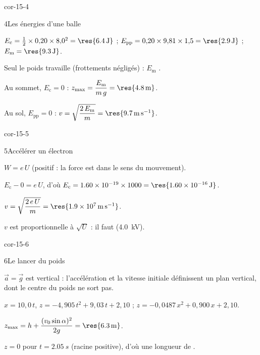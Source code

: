 \begin{blocLivre}{cor-15-4}
\begin{corrige}{4}{Les énergies d'une balle}
\begin{questions}
\item $E_\mathrm{c}=\frac12\times0{,}20\times8{,}0^2=\res{\qty{6,4}{J}}$ ; $E_\mathrm{pp}=0{,}20\times9{,}81\times1{,}5=\res{\qty{2,9}{J}}$ ;
$E_\mathrm{m}=\res{\qty{9,3}{J}}$.
\item Seul le poids travaille (frottements négligés) : $E_\mathrm{m}$ .
\item Au sommet, $E_\mathrm{c}=0$ : $z_{\max}=\dfrac{E_\mathrm{m}}{m\,g}=\res{\qty{4,8}{m}}$.
\item Au sol, $E_\mathrm{pp}=0$ : $v=\sqrt{\dfrac{2\,E_\mathrm{m}}{m}}=\res{\qty{9,7}{m.s^{-1}}}$.
\end{questions}
\end{corrige}
\end{blocLivre}
\begin{blocLivre}{cor-15-5}
\begin{corrige}{5}{Accélérer un électron}
\begin{questions}
\item $W=e\,U$ (positif : la force est dans le sens du mouvement).
\item $E_\mathrm{c}-0=e\,U$, d'où $E_\mathrm{c}=\num{1.60e-19}\times1000=\res{\qty{1,60e-16}{J}}$.
\item $v=\sqrt{\dfrac{2\,e\,U}{m}}=\res{\qty{1,9e7}{m.s^{-1}}}$.
\item $v$ est proportionnelle à $\sqrt{U}$ : il faut  (\qty{4,0}{kV}).
\end{questions}
\end{corrige}
\end{blocLivre}
\begin{blocLivre}{cor-15-6}
\begin{corrige}{6}{Le lancer du poids}
\begin{questions}
\item $\vec{a}=\vec{g}$ est vertical : l'accélération et la vitesse initiale définissent un plan vertical, dont le centre
du poids ne sort pas.
\item $x=10{,}0\,t$, $z=-4{,}905\,t^2+9{,}03\,t+2{,}10$ ; $z=-0{,}0487\,x^2+0{,}900\,x+2{,}10$.
\item $z_{\max}=h+\dfrac{(v_0\sin\alpha)^2}{2g}=\res{\qty{6,3}{m}}$.
\item $z=0$ pour $t=\qty{2,05}{s}$ (racine positive), d'où une longueur de .
\end{questions}
\end{corrige}
\end{blocLivre}
